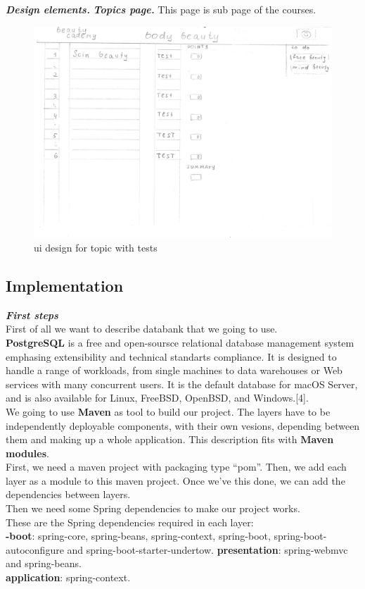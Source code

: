 \documentclass{scrartcl}
\begin{document}
\textbf{\textit{Design elements.}}
\textbf{\textit{Topics page.}}
This page is sub page of the courses.
\begin{figure}[H]
\centering
\includegraphics[width = 140mm]{proto-foto/ui-test-topic.JPG}
\caption{ui design for topic with tests}
\label{topics page}
\end{figure}


\subsection{Implementation}
\textbf{\textit{First steps}}\\
First of all we want to describe databank that we going to use.\\
\textbf{PostgreSQL} is a free and open-soursce relational database management system emphasing extensibility and technical standarts compliance. It is designed to handle a range of workloads, from single machines to data warehouses or Web services with many concurrent users. It is the default database for macOS Server, and is also available for Linux, FreeBSD, OpenBSD, and Windows.[4].\\

 We going to use \textbf{Maven} as tool to build our project. The layers have to be independently deployable components, with  their own vesions, depending between them and making up a whole application. This description fits with \textbf{Maven modules}.\\
 First, we need a maven project with packaging type “pom”. Then, we add each layer as a module to this maven project. Once we’ve this done, we can add the dependencies between layers.\\
 Then we need some Spring dependencies to make our project works.\\
 These are the Spring dependencies required in each layer:\\
\textbf{-boot}: spring-core, spring-beans, spring-context, spring-boot, spring-boot-autoconfigure     	and spring-boot-starter-undertow.
\textbf{presentation}: spring-webmvc and spring-beans.\\
\textbf{application}: spring-context.\\
\end{document}
